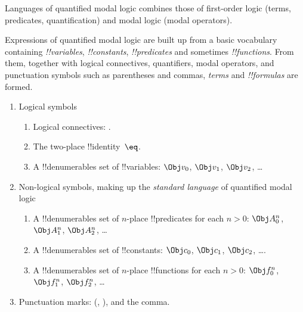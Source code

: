 \documentclass[../../../include/open-logic-section]{subfiles}
\begin{document}


\begin{explain}
Languages of quantified modal logic combines those of
first-order logic (terms, predicates, quantification)
and modal logic (modal operators).
\end{explain}

Expressions of quantified modal logic are built up from a basic vocabulary
containing \emph{!!{variable}s}, \emph{!!{constant}s},
\emph{!!{predicate}s} and sometimes \emph{!!{function}s}.  From them,
together with logical connectives, quantifiers, modal operators, 
and punctuation symbols such as parentheses and commas, \emph{terms} and
\emph{!!{formula}s} are formed. 

\begin{enumerate}
\item Logical symbols
\begin{enumerate}
\item Logical connectives:
  \startycommalist
  .
\item The two-place !!{identity}~$\eq$.
\item A !!{denumerable}s set of !!{variable}s: $\Obj v_0$, $\Obj v_1$, $\Obj
  v_2$, \dots
\end{enumerate}
\item Non-logical symbols, making up the \emph{standard
  language} of quantified modal logic
\begin{enumerate}
\item A !!{denumerable}s set of $n$-place !!{predicate}s for each $n>0$: $\Obj
  A^n_0$, $\Obj A^n_1$, $\Obj A^n_2$, \dots
\item A !!{denumerable}s set of !!{constant}s: $\Obj c_0$, $\Obj c_1$, $\Obj
  c_2$, \dots.
\item A !!{denumerable}s set of $n$-place !!{function}s for each $n>0$:
  $\Obj f^n_0$, $\Obj f^n_1$, $\Obj f^n_2$, \dots
\end{enumerate}
\item Punctuation marks: (, ), and the comma.
\end{enumerate}
\end{document}
